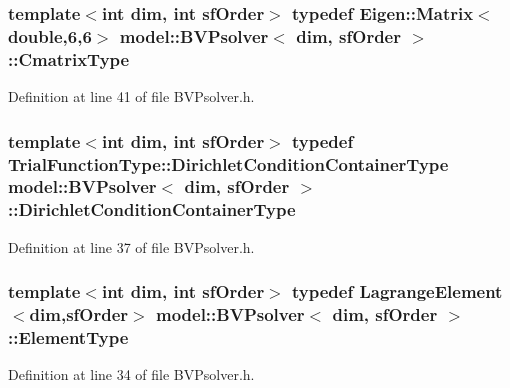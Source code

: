 \subsubsection[{Cmatrix\+Type}]{\setlength{\rightskip}{0pt plus 5cm}template$<$int dim, int sf\+Order$>$ typedef Eigen\+::\+Matrix$<$double,6,6$>$ {\bf model\+::\+B\+V\+Psolver}$<$ {\bf dim}, sf\+Order $>$\+::{\bf Cmatrix\+Type}}\label{classmodel_1_1_b_v_psolver_a5c38d43773f72a099a19d5e4663e9c20}


Definition at line 41 of file B\+V\+Psolver.\+h.

\hypertarget{classmodel_1_1_b_v_psolver_a3c554c06786ce95b5d2078baf47ad817}{}
\subsubsection[{Dirichlet\+Condition\+Container\+Type}]{\setlength{\rightskip}{0pt plus 5cm}template$<$int dim, int sf\+Order$>$ typedef {\bf Trial\+Function\+Type\+::\+Dirichlet\+Condition\+Container\+Type} {\bf model\+::\+B\+V\+Psolver}$<$ {\bf dim}, sf\+Order $>$\+::{\bf Dirichlet\+Condition\+Container\+Type}}\label{classmodel_1_1_b_v_psolver_a3c554c06786ce95b5d2078baf47ad817}


Definition at line 37 of file B\+V\+Psolver.\+h.

\hypertarget{classmodel_1_1_b_v_psolver_ae2e9c254c6f06d0217b460e184f1dbc0}{}
\subsubsection[{Element\+Type}]{\setlength{\rightskip}{0pt plus 5cm}template$<$int dim, int sf\+Order$>$ typedef {\bf Lagrange\+Element}$<${\bf dim},sf\+Order$>$ {\bf model\+::\+B\+V\+Psolver}$<$ {\bf dim}, sf\+Order $>$\+::{\bf Element\+Type}}\label{classmodel_1_1_b_v_psolver_ae2e9c254c6f06d0217b460e184f1dbc0}


Definition at line 34 of file B\+V\+Psolver.\+h.

\hypertarget{classmodel_1_1_b_v_psolver_a010425e48ff247a2d8203f4625b29ea1}{}
